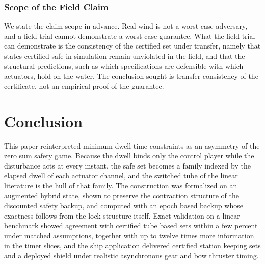 \documentclass[journal]{IEEEtran}
\begin{document}
\subsubsection{Scope of the Field Claim}

We state the claim scope in advance. Real wind is not a worst case adversary, and a field trial cannot demonstrate a worst case guarantee. What the field trial can demonstrate is the consistency of the certified set under transfer, namely that states certified safe in simulation remain unviolated in the field, and that the structural predictions, such as which specifications are defensible with which actuators, hold on the water. The conclusion sought is transfer consistency of the certificate, not an empirical proof of the guarantee.

\section{Conclusion}\label{sec_conclusion}

This paper reinterpreted minimum dwell time constraints as an asymmetry of the zero sum safety game. Because the dwell binds only the control player while the disturbance acts at every instant, the safe set becomes a family indexed by the elapsed dwell of each actuator channel, and the switched tube of the linear literature is the hull of that family. The construction was formalized on an augmented hybrid state, shown to preserve the contraction structure of the discounted safety backup, and computed with an epoch based backup whose exactness follows from the lock structure itself. Exact validation on a linear benchmark showed agreement with certified tube based sets within a few percent under matched assumptions, together with up to twelve times more information in the timer slices, and the ship application delivered certified station keeping sets and a deployed shield under realistic asynchronous gear and bow thruster timing.
\end{document}
